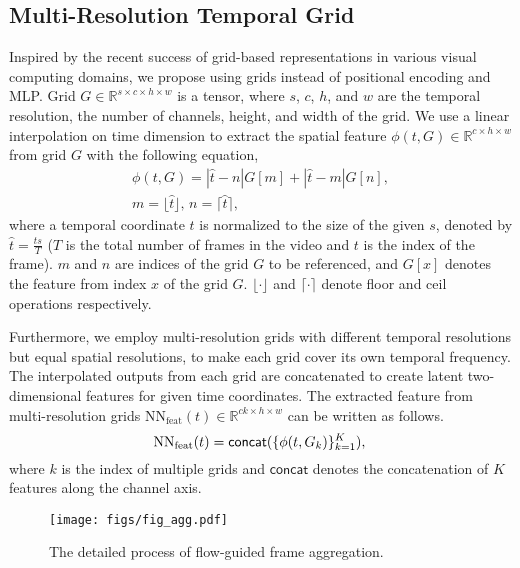 \documentclass[sigconf]{acmart}
\begin{document}
\subsection{Multi-Resolution Temporal Grid}
Inspired by the recent success of grid-based representations in various visual computing domains, we propose using grids instead of positional encoding and MLP.
Grid $G \in \mathbb{R}^{s \times c \times h \times w}$ is a tensor, where $s$, $c$, $h$, and $w$ are the temporal resolution, the number of channels, height, and width of the grid.
We use a linear interpolation on time dimension to extract the spatial feature $\phi(t,G) \in \mathbb{R}^{c \times h \times w}$ from grid $G$ with the following equation,
\begin{equation}
\label{bi_intp}
\begin{gathered}
    \phi(t,G)=|\hat{t}-n|G[m]+|\hat{t}-m|G[n],\\
    m=\lfloor \hat{t}\rfloor,\, n=\lceil \hat{t} \rceil,
\end{gathered}
\end{equation}
where a temporal coordinate $t$ is normalized to the size of the given $s$, denoted by $\hat{t} = \frac{ts}{T}$ ($T$ is the total number of frames in the video and $t$ is the index of the frame).
$m$ and $n$ are indices of the grid $G$ to be referenced, and $G[x]$ denotes the feature from index $x$ of the grid $G$.
$\lfloor \cdot \rfloor$ and $\lceil \cdot \rceil$ denote floor and ceil operations respectively.

Furthermore, we employ multi-resolution grids with different temporal resolutions but equal spatial resolutions, to make each grid cover its own temporal frequency.
The interpolated outputs from each grid are concatenated to create latent two-dimensional features for given time coordinates.
The extracted feature from multi-resolution grids $\textrm{NN}_{\textrm{feat}}(t) \in \mathbb{R}^{ck \times h \times w}$ can be written as follows.
\begin{equation}
\label{f_t}
    \textrm{NN}_{\textrm{feat}}(t)=\mathsf{concat}(\{ \phi(t,G_k) \}_{k=1}^{K}),\\
\end{equation}
where $k$ is the index of multiple grids and $\mathsf{concat}$ denotes the concatenation of $K$ features along the channel axis.


\begin{figure}[t]
\begin{center}
\texttt{[image: figs/fig\_agg.pdf]}
\end{center}
   \caption{The detailed process of flow-guided frame aggregation.}
\label{fig_agg}
\end{figure}
\end{document}
